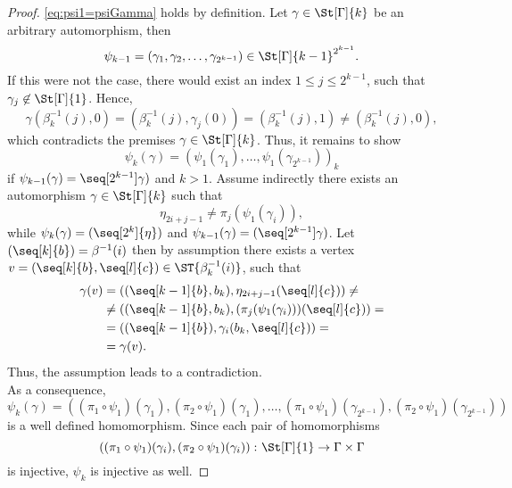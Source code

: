 \begin{proof}
\cref{eq:psi1=psiGamma} holds by definition. Let $\gamma\in\St[\Gamma]{k}$ be an arbitrary automorphism, then 
\begin{equation*}
\psi_{k-1}=(\gamma_1,\gamma_2,\ldots,\gamma_{2^{k-1}})\in\St[\Gamma]{k-1}^{2^{k-1}}.
\end{equation*}
If this were not the case, there would exist an index $1\leq j\leq 2^{k-1}$, such that $\gamma_j\not\in\St[\Gamma]{1}$. Hence, 
\begin{equation*}
\gamma(\beta_k^{-1}(j),0)=(\beta_k^{-1}(j),\gamma_j(0))=(\beta_k^{-1}(j),1)\neq(\beta_k^{-1}(j),0),
\end{equation*}
which contradicts the premises $\gamma\in\St[\Gamma]{k}$. Thus, it remains to show
\begin{equation*}
\psi_k(\gamma)=(\psi_1(\gamma_1),\ldots,\psi_1(\gamma_{2^{k-1}}))_k
\end{equation*}
if $\psi_{k-1}(\gamma)=\seq[2^{k-1}]{\gamma})$ and $k>1$. Assume indirectly there exists an automorphism $\gamma\in\St[\Gamma]{k}$ such that
\begin{equation*}
\eta_{2i+j-1}\neq\pi_j(\psi_1(\gamma_i)),
\end{equation*}
while $\psi_k(\gamma)=(\seq[2^k]{\eta})$ and $\psi_{k-1}(\gamma)=(\seq[2^{k-1}]{\gamma})$. Let $(\seq[k]{b})=\beta^{-1}(i)$ then by assumption there exists a vertex $v=(\seq[k]{b},\seq[l]{c})\in\ST{\beta_k^{-1}(i)}$, such that
\begin{align*}
\gamma(v)	&=		((\seq[k-1]{b},b_k),\eta_{2i+j-1}(\seq[l]{c}))\neq\\
			&\neq	((\seq[k-1]{b},b_k),(\pi_j(\psi_1(\gamma_i)))(\seq[l]{c}))=\\
			&=		((\seq[k-1]{b}),\gamma_i(b_k,\seq[l]{c}))=\\
			&=		\gamma(v).
\end{align*}
Thus, the assumption leads to a contradiction.\\
As a consequence, 
\begin{equation*}
\psi_k(\gamma)=\left((\pi_1\circ\psi_1)(\gamma_1),(\pi_2\circ\psi_1)(\gamma_1),\ldots,(\pi_1\circ\psi_1)(\gamma_{2^{k-1}}),(\pi_2\circ\psi_1)(\gamma_{2^{k-1}})\right)
\end{equation*}
is a well defined homomorphism. Since each pair of homomorphisms 
\begin{equation*}
\left((\pi_1\circ\psi_1)(\gamma_i),(\pi_2\circ\psi_1)(\gamma_i)\right)\colon\St[\Gamma]{1}\to\Gamma\times\Gamma
\end{equation*}
is injective, $\psi_k$ is injective as well.
\end{proof}
